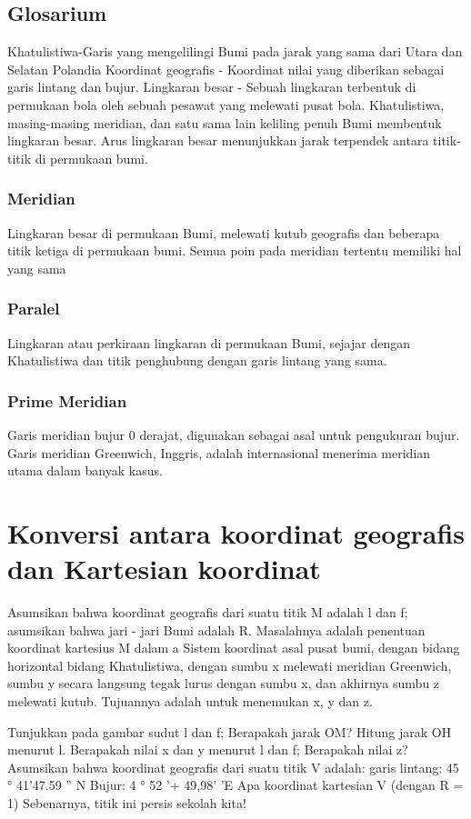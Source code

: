 \subsection{Glosarium}
	Khatulistiwa-Garis yang mengelilingi Bumi pada jarak yang sama dari Utara dan Selatan
	Polandia Koordinat geografis - Koordinat nilai yang diberikan sebagai garis lintang dan bujur.
	Lingkaran besar - Sebuah lingkaran terbentuk di permukaan bola oleh sebuah pesawat yang melewati
	pusat bola. Khatulistiwa, masing-masing meridian, dan satu sama lain keliling penuh
	Bumi membentuk lingkaran besar. Arus lingkaran besar menunjukkan jarak terpendek antara titik-titik di permukaan bumi.

	\subsubsection{Meridian}
	Lingkaran besar di permukaan Bumi, melewati kutub geografis
	dan beberapa titik ketiga di permukaan bumi. Semua poin pada meridian tertentu memiliki hal yang sama
	\subsubsection{Paralel}
	Lingkaran atau perkiraan lingkaran di permukaan Bumi, sejajar dengan
	Khatulistiwa dan titik penghubung dengan garis lintang yang sama.
	\subsubsection{Prime Meridian}
	Garis meridian bujur 0 derajat, digunakan sebagai asal untuk
	pengukuran bujur. Garis meridian Greenwich, Inggris, adalah internasional
	menerima meridian utama dalam banyak kasus.

\section{Konversi antara koordinat geografis dan Kartesian koordinat}
	Asumsikan bahwa koordinat geografis dari suatu titik M adalah l dan f; asumsikan bahwa jari - jari
	Bumi adalah R. Masalahnya adalah penentuan koordinat kartesius M dalam a
	Sistem koordinat asal pusat bumi, dengan bidang horizontal bidang
	Khatulistiwa, dengan sumbu x melewati meridian Greenwich, sumbu y secara langsung
	tegak lurus dengan sumbu x, dan akhirnya sumbu z melewati kutub.
	Tujuannya adalah untuk menemukan x, y dan z.

	Tunjukkan pada gambar sudut l dan f;
	Berapakah jarak OM?
	Hitung jarak OH menurut l.
	Berapakah nilai x dan y menurut l dan f;
	Berapakah nilai z?
	Asumsikan bahwa koordinat geografis dari suatu titik V
	adalah:
	garis lintang: 45 ° 41'47.59 '' N
	Bujur: 4 ° 52 '+ 49,98' 'E
	Apa koordinat kartesian V (dengan R = 1)
	Sebenarnya, titik ini persis sekolah kita!

